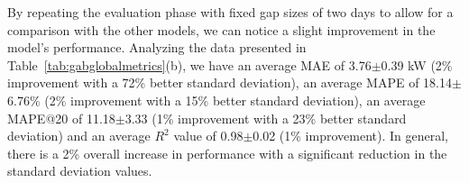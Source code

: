 \begin{figure}[]
	\label{fig:gabsolobuchi2giorni}
\end{figure}

By repeating the evaluation phase with fixed gap sizes of two days to allow for a comparison with the other models, we can notice a slight improvement in the model's performance. Analyzing the data presented in Table~\ref{tab:gabglobalmetrics}(b), we have an average MAE of 3.76$\pm$0.39 kW (2\% improvement with a 72\% better standard deviation), an average MAPE of 18.14$\pm$6.76\% (2\% improvement with a 15\% better standard deviation), an average MAPE@20 of 11.18$\pm$3.33 (1\% improvement with a 23\% better standard deviation) and an average $R^2$ value of 0.98$\pm$0.02 (1\% improvement). In general, there is a 2\% overall increase in performance with a significant reduction in the standard deviation values.


